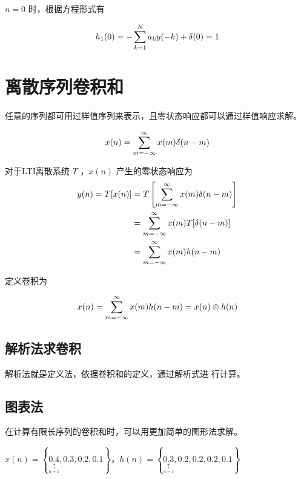 \documentclass[cn,11pt,chinese,black,simple]{../elegantbook}
\begin{document}
\(n = 0\) 时，根据方程形式有  

\[h_{1}(0)=-\displaystyle\sum_{k=1}^{N} a_{k} y(-k)+\delta(0)=1\]



\section{离散序列卷积和}

任意的序列都可用过样值序列来表示，且零状态响应都可以通过样值响应求解。

\[
x(n)=\displaystyle\sum_{m=-\infty}^{\infty} x(m) \delta(n-m)
\]

对于LTI离散系统 \(T\) ，\(x(n)\) 产生的零状态响应为
\[
\begin{aligned}
y(n)=T[x(n)] &=T\left[\displaystyle\sum_{m=-\infty}^{\infty} x(m) \delta(n-m)\right] \\
&=\displaystyle\sum_{m=-\infty}^{\infty} x(m) T[\delta(n-m)] \\
&=\displaystyle\sum_{m=-\infty}^{\infty} x(m) h(n-m)
\end{aligned}
\]

定义卷积为 

\[
x(n)=\displaystyle\sum_{m=-\infty}^{\infty} x(m) h(n-m) = x(n) \otimes h(n)
\]

\subsection{解析法求卷积}


解析法就是定义法，依据卷积和的定义，通过解析式进
行计算。

\subsection{图表法}

在计算有限长序列的卷积和时，可以用更加简单的图形法求解。

\begin{example}
    \(x(n) = \left\{\underset{\mathop{\uparrow}\limits_{n=1}}{0.4},0.3,0.2,0.1\right\}\)，\(h(n) = \left\{\underset{\mathop{\uparrow}\limits_{n=1}}{0.3},0.2,0.2,0.2,0.1\right\}\)
\end{example}

\clearpage
\end{document}
